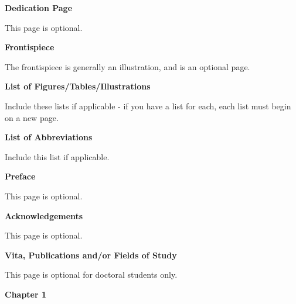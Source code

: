 \documentclass[12pt]{article}
\begin{document}
\newpage
\centerline{\bf{Dedication Page}}
\vspace*{4\baselineskip}
This page is optional.

\newpage
\centerline{\bf{Frontispiece}}
\vspace*{4\baselineskip}
The frontispiece is generally an illustration, and is an optional page.

\newpage


\newpage
\centerline{\bf{List of Figures/Tables/Illustrations}}
\vspace*{4\baselineskip}
Include these lists if applicable - if you have a list for each, each list must begin on a new page.

\newpage
\centerline{\bf{List of Abbreviations}}
\vspace*{4\baselineskip}
Include this list if applicable.

\newpage
\centerline{\bf{Preface}}
\vspace*{4\baselineskip}
This page is optional.

\newpage
\centerline{\bf{Acknowledgements}}
\vspace*{4\baselineskip}
This page is optional.

\newpage
\centerline{\bf{Vita, Publications and/or Fields of Study}}
\vspace*{4\baselineskip}
This page is optional for doctoral students only.

\newpage
\tableofcontents

\newpage
{}
\centerline{\bf{Chapter 1}}
\end{document}
